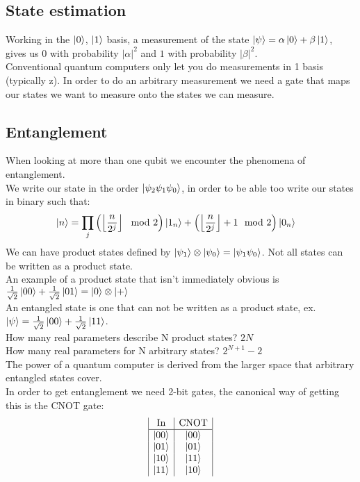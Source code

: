 \subsection{State estimation}
Working in the $\ket{0}$, $\ket{1}$ basis, a measurement of the state $\ket{\psi} = \alpha \ket{0} + \beta \ket{1}$, gives us $0$ with probability $|\alpha|^2$ and $1$ with probability $|\beta|^2$.\\
Conventional quantum computers only let you do measurements in 1 basis (typically z). In order to do an arbitrary measurement we need a gate that maps our states we want to measure onto the states we can measure.
\subsection{Entanglement}
When looking at more than one qubit we encounter the phenomena of entanglement. \\
We write our state in the order $\ket{\psi_2 \psi_1 \psi_0}$, in order to be able too write our states in binary such that:
\begin{align*}
	\ket{n} &= \prod_j \left(\left\lfloor\frac{n}{2^j}\right\rfloor \mod 2\right)\ket{1_n} + \left(\left\lfloor\frac{n}{2^j}\right\rfloor + 1 \mod 2\right)\ket{0_n}
\end{align*}
We can have product states defined by $\ket{\psi_1}\otimes\ket{\psi_0} = \ket{\psi_1\psi_0}$. Not all states can be written as a product state. \\
An example of a product state that isn't immediately obvious is $\frac{1}{\sqrt{2}} \ket{00} + \frac{1}{\sqrt{2}} \ket{01} = \ket{0} \otimes \ket{+}$ \\
An entangled state is one that can not be written as a product state, ex. $\ket{\psi} = \frac{1}{\sqrt{2}} \ket{00} + \frac{1}{\sqrt{2}} \ket{11}$. \\
How many real parameters describe N product states? $2N$\\
How many real parameters for N arbitrary states? $2^{N+1} -2$ \\
The power of a quantum computer is derived from the larger space that arbitrary entangled states cover. \\
In order to get entanglement we need 2-bit gates, the canonical way of getting this is the CNOT gate:
\begin{displaymath}
	\begin{array}{|c | c|}
		\text{In} & \text{CNOT} \\
		\hline
		\ket{00} & \ket{00} \\
		\ket{01} & \ket{01} \\
		\ket{10} & \ket{11} \\
		\ket{11} & \ket{10}
       \end{array}
\end{displaymath}
